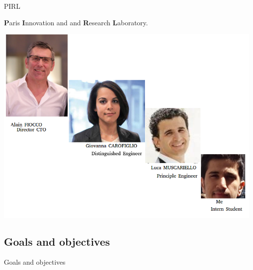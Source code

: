 \documentclass[8pt]{beamer}
\newcommand{\1}{\mathbbm 1}
\begin{document}
\begin{frame}{PIRL}

\textbf{P}aris \textbf{I}nnovation and and \textbf{R}esearch \textbf{L}aboratory.

\begin{center}
\includegraphics[scale=0.22]{figures/photos.png}
\end{center}



\end{frame}





\subsection{Goals and objectives}
\begin{frame}{Goals and objectives}



\end{frame}
\end{document}

